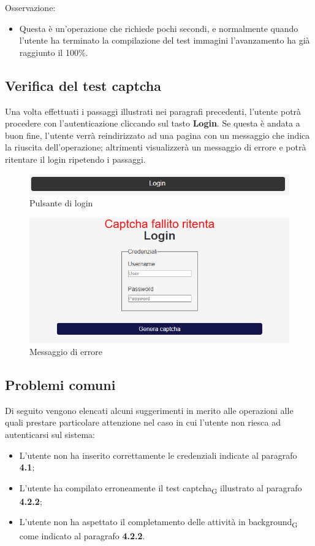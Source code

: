 Osservazione:
\begin{itemize}
	\item Questa è un'operazione che richiede pochi secondi, e normalmente quando l'utente ha terminato la compilazione del test immagini l'avanzamento ha già raggiunto il 100\%.
\end{itemize}

\subsection{Verifica del test captcha}
Una volta effettuati i passaggi illustrati nei paragrafi precedenti, l'utente potrà procedere con l'autenticazione cliccando sul tasto \textbf{Login}. Se questa è andata a buon fine, l'utente verrà reindirizzato ad una pagina con un messaggio che indica la riuscita dell'operazione; altrimenti visualizzerà un messaggio di errore e potrà ritentare il login ripetendo i passaggi.

\begin{figure}[H]
    \centering
    \includegraphics[scale=0.8]{img/tastologin.png}
    \caption{Pulsante di login}
\end{figure}

\begin{figure}[H]
	\centering
	\includegraphics[scale=0.8]{img/message.png}
	\caption{Messaggio di errore}
\end{figure}   

\subsection{Problemi comuni}
Di seguito vengono elencati alcuni suggerimenti in merito alle operazioni alle quali prestare particolare attenzione nel caso in cui l'utente non riesca ad autenticarsi sul sistema:
\begin{itemize}
	\item L'utente non ha inserito correttamente le credenziali indicate al paragrafo \textbf{4.1};
    \item L'utente ha compilato erroneamente il test captcha\textsubscript{G} illustrato al paragrafo \textbf{4.2.2};
    \item L'utente non ha aspettato il completamento delle attività in background\textsubscript{G} come indicato al paragrafo \textbf{4.2.2}.
\end{itemize} 
